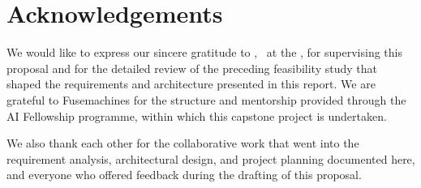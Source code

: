\chapter*{Acknowledgements}

We would like to express our sincere gratitude to \cSupervisor, \cSupervisorTitle\ at the \cSupervisorDept, for supervising this proposal and for the detailed review of the preceding feasibility study that shaped the requirements and architecture presented in this report. We are grateful to Fusemachines for the structure and mentorship provided through the AI Fellowship programme, within which this capstone project is undertaken.

We also thank each other for the collaborative work that went into the requirement analysis, architectural design, and project planning documented here, and everyone who offered feedback during the drafting of this proposal.

\vspace{1cm}
\noindent
\cSubmittedI \\
\cSubmittedII
